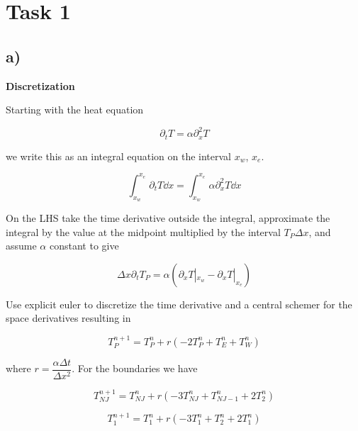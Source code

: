 \documentclass{article}
\begin{document}

\section{Task 1}

\subsection*{a)}

\textbf{Discretization}

Starting with the heat equation

\begin{equation}
	\partial_t T = \alpha \partial_x^2 T
\end{equation}

we write this as an integral equation on the interval $x_w$, $x_e$.

\begin{equation}
	\int_{x_w}^{x_e}  \partial_t T \dd{x} = \int_{x_w}^{x_e}  \alpha \partial_x^2 T \dd{x}
\end{equation}

On the LHS take the time derivative outside the integral, approximate the integral by the value at the midpoint multiplied by the interval $T_P \Delta x$, and assume $\alpha$ constant to give

\begin{equation}
 	\Delta x\partial_t T_P = \alpha (\partial_x T |_{x_w} - \partial_x T |_{x_e})
\end{equation}

Use explicit euler to discretize the time derivative and a central schemer for the space derivatives resulting in

\begin{equation}
	\label{eq:explicit}
 	T_P^{n+1} = T_P^n + r ( -2T_P^n + T_E^n + T_W^n)
\end{equation}

where $r = \dfrac{\alpha \Delta t }{\Delta x^2} $. For the boundaries we have 

\begin{equation}
 	T_{NJ}^{n+1} = T_{NJ}^n + r ( -3T_{NJ}^n + T_{NJ-1}^n + 2T_2^n)
\end{equation}

\begin{equation}
 	T_{1}^{n+1} = T_1^n + r ( -3T_{1}^n + T_{2}^n + 2T_1^n)
\end{equation}
\end{document}
